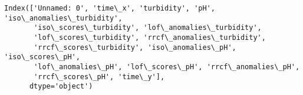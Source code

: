             \begin{tcolorbox}[breakable, size=fbox, boxrule=.5pt, pad at break*=1mm, opacityfill=0]
\begin{Verbatim}[commandchars=\\\{\}]
Index(['Unnamed: 0', 'time\_x', 'turbidity', 'pH', 'iso\_anomalies\_turbidity',
       'iso\_scores\_turbidity', 'lof\_anomalies\_turbidity',
       'lof\_scores\_turbidity', 'rrcf\_anomalies\_turbidity',
       'rrcf\_scores\_turbidity', 'iso\_anomalies\_pH', 'iso\_scores\_pH',
       'lof\_anomalies\_pH', 'lof\_scores\_pH', 'rrcf\_anomalies\_pH',
       'rrcf\_scores\_pH', 'time\_y'],
      dtype='object')
\end{Verbatim}
\end{tcolorbox}
        
